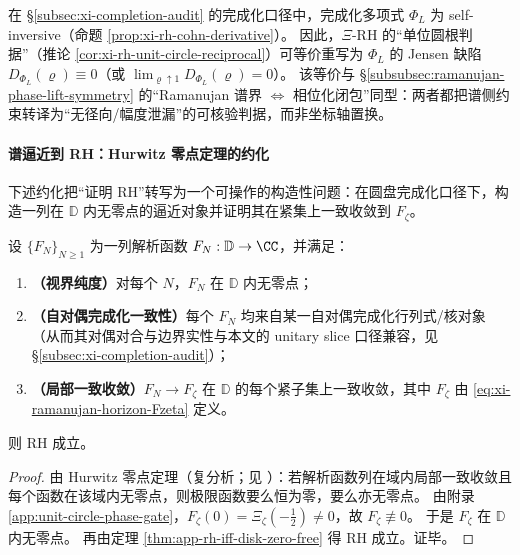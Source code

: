 \begin{corollary}\label{cor:xi-finite-ramanujan-defect-translation}
在 \S\ref{subsec:xi-completion-audit} 的完成化口径中，完成化多项式 \(\Phi_L\) 为 self-inversive（命题 \ref{prop:xi-rh-cohn-derivative}）。
因此，\(\Xi\)-RH 的“单位圆根判据”（推论 \ref{cor:xi-rh-unit-circle-reciprocal}）可等价重写为 \(\Phi_L\) 的 Jensen 缺陷 \(D_{\Phi_L}(\varrho)\equiv 0\)（或 \(\lim_{\varrho\uparrow 1}D_{\Phi_L}(\varrho)=0\)）。
该等价与 \S\ref{subsubsec:ramanujan-phase-lift-symmetry} 的“Ramanujan 谱界 \(\Leftrightarrow\) 相位化闭包”同型：两者都把谱侧约束转译为“无径向/幅度泄漏”的可核验判据，而非坐标轴置换。
\end{corollary}

\paragraph{谱逼近到 RH：Hurwitz 零点定理的约化}
下述约化把“证明 RH”转写为一个可操作的构造性问题：在圆盘完成化口径下，构造一列在 \(\mathbb{D}\) 内无零点的逼近对象并证明其在紧集上一致收敛到 \(F_{\zeta}\)。

\begin{theorem}\label{thm:xi-hurwitz-horizon-reduction}
设 \(\{F_N\}_{N\ge 1}\) 为一列解析函数 \(F_N:\mathbb{D}\to\CC\)，并满足：
\begin{enumerate}
  \item \textbf{（视界纯度）}对每个 \(N\)，\(F_N\) 在 \(\mathbb{D}\) 内无零点；
  \item \textbf{（自对偶完成化一致性）}每个 \(F_N\) 均来自某一自对偶完成化行列式/核对象（从而其对偶对合与边界实性与本文的 unitary slice 口径兼容，见 \S\ref{subsec:xi-completion-audit}）；
  \item \textbf{（局部一致收敛）}\(F_N\to F_{\zeta}\) 在 \(\mathbb{D}\) 的每个紧子集上一致收敛，其中 \(F_{\zeta}\) 由 \eqref{eq:xi-ramanujan-horizon-Fzeta} 定义。
\end{enumerate}
则 RH 成立。
\end{theorem}

\begin{proof}
由 Hurwitz 零点定理（复分析；见 \cite[Chapter~4]{Ahlfors1979ComplexAnalysis}）：若解析函数列在域内局部一致收敛且每个函数在该域内无零点，则极限函数要么恒为零，要么亦无零点。
由附录 \ref{app:unit-circle-phase-gate}，\(F_{\zeta}(0)=\Xi_{\zeta}(-\tfrac12)\neq 0\)，故 \(F_{\zeta}\not\equiv 0\)。
于是 \(F_{\zeta}\) 在 \(\mathbb{D}\) 内无零点。
再由定理 \ref{thm:app-rh-iff-disk-zero-free} 得 RH 成立。证毕。
\end{proof}

